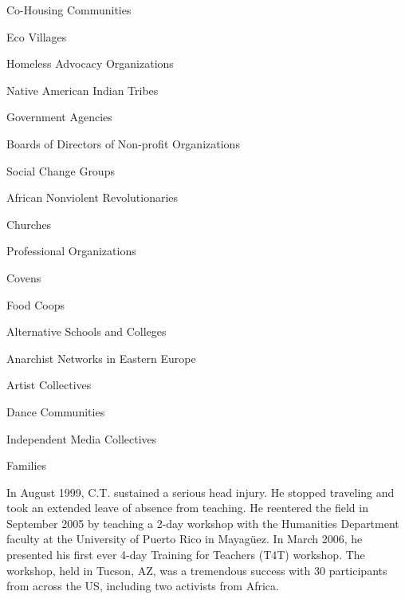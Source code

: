 \squishitemize%

	\item Co-Housing Communities

	\item Eco Villages

	\item Homeless Advocacy Organizations

	\item Native American Indian Tribes

	\item Government Agencies

	\item Boards of Directors of Non-profit Organizations

	\item Social Change Groups

	\item African Nonviolent Revolutionaries

	\item Churches

	\item Professional Organizations

	\item Covens

	\item Food Coops

	\item Alternative Schools and Colleges

	\item Anarchist Networks in Eastern Europe

	\item Artist Collectives

	\item Dance Communities

	\item Independent Media Collectives

	\item Families
\squishend%


In August 1999, C.T. sustained a serious head injury. He stopped traveling and took an extended leave of absence from teaching. He reentered the field in September 2005 by teaching a 2-day workshop with the Humanities Department faculty at the University of Puerto Rico in Mayagüez. In March 2006, he presented his first ever 4-day Training for Teachers (T4T) workshop. The workshop, held in Tucson, AZ, was a tremendous success with 30 participants from across the US, including two activists from Africa. 

